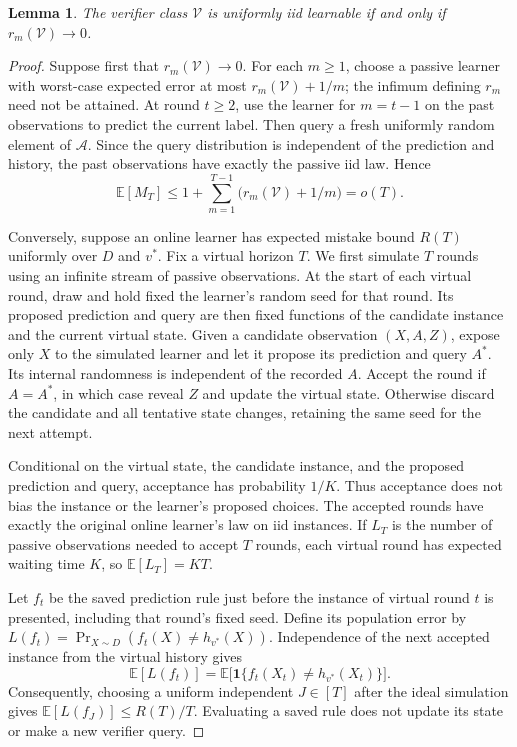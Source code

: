 \documentclass[11pt]{article}
\newcommand{\V}{\mathcal V}
\newcommand{\A}{\mathcal A}
\newcommand{\E}{\mathbb E}
\newcommand{\ind}{\mathbf 1}
\newtheorem{lemma}[theorem]{Lemma}
\begin{document}
\begin{lemma}\label{lem:passive-equivalence}
The verifier class $\V$ is uniformly iid learnable if and only if
$r_m(\V)\to0$.
\end{lemma}
\begin{proof}
Suppose first that $r_m(\V)\to0$. For each $m\ge1$, choose a passive
learner with worst-case expected error at most $r_m(\V)+1/m$; the
infimum defining $r_m$ need not be attained. At round $t\ge2$, use the
learner for $m=t-1$ on the past observations to predict the current label.
Then query a fresh uniformly random element of $\A$. Since the query
distribution is independent of the prediction and history, the past
observations have exactly the passive iid law. Hence
\[
\E[M_T]\le1+\sum_{m=1}^{T-1}\bigl(r_m(\V)+1/m\bigr)=o(T).
\]

Conversely, suppose an online learner has expected mistake bound $R(T)$
uniformly over $D$ and $v^*$. Fix a virtual horizon $T$. We first simulate
$T$ rounds using an infinite stream of passive observations. At the start
of each virtual round, draw and hold fixed the learner's random seed for
that round. Its proposed prediction and query are then fixed functions of
the candidate instance and the current virtual state. Given a candidate
observation $(X,A,Z)$, expose only
$X$ to the simulated learner and let it propose its prediction and query
$A^*$. Its internal randomness is independent of the recorded $A$.
Accept the round if $A=A^*$, in which case reveal $Z$ and update the
virtual state. Otherwise discard the candidate and all tentative state
changes, retaining the same seed for the next attempt.

Conditional on the virtual state, the candidate instance, and the proposed
prediction and query, acceptance has probability $1/K$. Thus acceptance
does not bias the instance or the learner's proposed choices. The accepted
rounds have exactly the original online learner's law on iid instances.
If $L_T$ is the number of passive observations needed to accept $T$ rounds,
each virtual round has expected waiting time $K$, so $\E[L_T]=KT$.

Let $f_t$ be the saved prediction rule just before the instance of virtual
round $t$ is presented, including that round's fixed seed. Define its population error
by $L(f_t)=\Pr_{X\sim D}(f_t(X)\ne h_{v^*}(X))$. Independence of the
next accepted instance from the virtual history gives
\[
\E[L(f_t)]
=\E\bigl[\ind\{f_t(X_t)\ne h_{v^*}(X_t)\}\bigr].
\]
Consequently, choosing a uniform independent $J\in[T]$ after the ideal
simulation gives $\E[L(f_J)]\le R(T)/T$. Evaluating a saved rule does not
update its state or make a new verifier query.


\end{proof}
\end{document}
